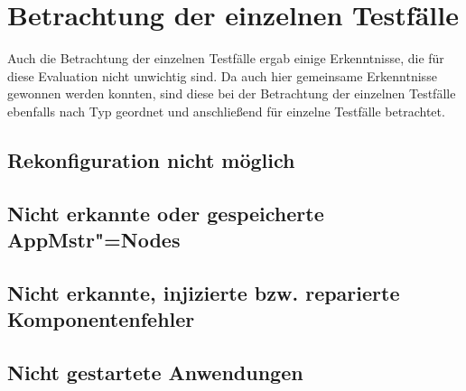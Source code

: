 \section{Betrachtung der einzelnen Testfälle}
\label{sec:specialResults}

Auch die Betrachtung der einzelnen Testfälle ergab einige Erkenntnisse, die für diese Evaluation nicht unwichtig sind.
Da auch hier gemeinsame Erkenntnisse gewonnen werden konnten, sind diese bei der Betrachtung der einzelnen Testfälle ebenfalls nach Typ geordnet und anschließend für einzelne Testfälle betrachtet.

\subsection{Rekonfiguration nicht möglich}
\label{sec:noReconfig}






\subsection{Nicht erkannte oder gespeicherte \ac{AppMstr}"=Nodes}
\label{sec:noDetectedHost2}




\subsection{Nicht erkannte, injizierte bzw. reparierte Komponentenfehler}
\label{sec:noDetectedFault}


\subsection{Nicht gestartete Anwendungen}
\label{sec:notStartedApps}


